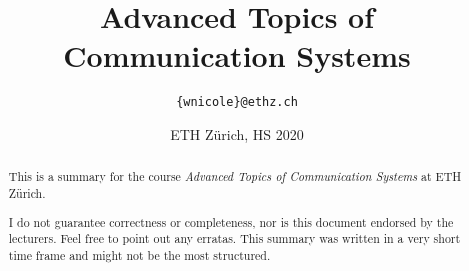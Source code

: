 \documentclass[paper=a4, parskip=half-]{scrartcl}
\title{Advanced Topics of Communication Systems}
\author{\texttt{\{wnicole\}@ethz.ch}}
\date{ETH Zürich, HS 2020}
\begin{document}
\begin{titlepage}
\maketitle
\vspace{5cm}
\thispagestyle{empty}


\begin{abstract}
This is a summary for the course \textit{Advanced Topics of Communication Systems} at ETH Zürich.

I do not guarantee correctness or completeness, nor is this document endorsed by the lecturers.
Feel free to point out any erratas. This summary was written in a very short time frame and might not be the most structured.
\end{abstract}

\end{titlepage}

\tableofcontents
\newpage


\newpage


\newpage


\newpage


\newpage


\newpage


\newpage


\newpage


\newpage
\end{document}
